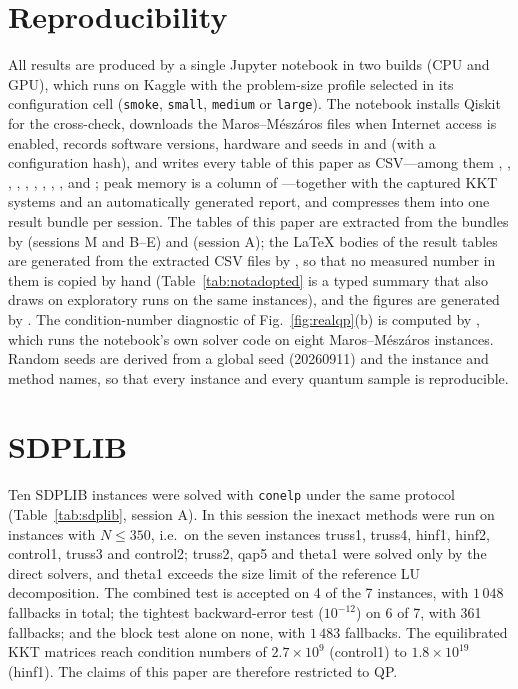 \documentclass[11pt]{article}
\theoremstyle{definition}
\newcommand{\dsus}{\textunderscore\penalty5000\hskip0pt\relax}
\newcommand{\ds}[1]{{\ttfamily\let\_\dsus#1}}
\begin{document}
\section{Reproducibility}\label{app:repro}
All results are produced by a single Jupyter notebook in two builds (CPU and GPU), which runs on Kaggle with the problem-size profile selected in its configuration cell (\texttt{smoke}, \texttt{small}, \texttt{medium} or \texttt{large}). The notebook installs Qiskit for the cross-check, downloads the Maros--M\'esz\'aros files when Internet access is enabled, records software versions, hardware and seeds in  and  (with a configuration hash), and writes every table of this paper as CSV---among them , , , , , , , , ,  and ; peak memory is a column of ---together with the captured KKT systems and an automatically generated report, and compresses them into one result bundle per session. The tables of this paper are extracted from the bundles by  (sessions M and B--E) and  (session A); the LaTeX bodies of the result tables are generated from the extracted CSV files by , so that no measured number in them is copied by hand (Table~\ref{tab:notadopted} is a typed summary that also draws on exploratory runs on the same instances), and the figures are generated by . The condition-number diagnostic of Fig.~\ref{fig:realqp}(b) is computed by , which runs the notebook's own solver code on eight Maros--M\'esz\'aros instances. Random seeds are derived from a global seed (20260911) and the instance and method names, so that every instance and every quantum sample is reproducible.

\section{SDPLIB}\label{app:sdplib}
Ten SDPLIB instances were solved with \texttt{conelp} under the same protocol (Table~\ref{tab:sdplib}, session A). In this session the inexact methods were run on instances with $N\le350$, i.e.\ on the seven instances \ds{truss1}, \ds{truss4}, \ds{hinf1}, \ds{hinf2}, \ds{control1}, \ds{truss3} and \ds{control2}; \ds{truss2}, \ds{qap5} and \ds{theta1} were solved only by the direct solvers, and \ds{theta1} exceeds the size limit of the reference LU decomposition. The combined test is accepted on 4 of the 7 instances, with $1\,048$ fallbacks in total; the tightest backward-error test ($10^{-12}$) on 6 of 7, with 361 fallbacks; and the block test alone on none, with $1\,483$ fallbacks. The equilibrated KKT matrices reach condition numbers of $2.7\times10^{9}$ (\ds{control1}) to $1.8\times10^{19}$ (\ds{hinf1}). The claims of this paper are therefore restricted to QP.
\end{document}
